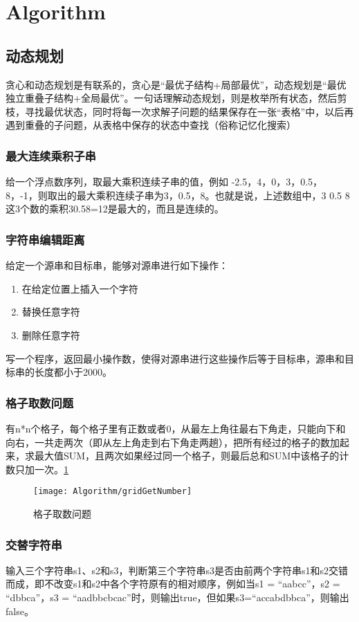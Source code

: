 \section{Algorithm}
\subsection{动态规划}
贪心和动态规划是有联系的，贪心是“最优子结构+局部最优”，动态规划是“最优独立重叠子结构+全局最优”。一句话理解动态规划，则是枚举所有状态，然后剪枝，寻找最优状态，同时将每一次求解子问题的结果保存在一张“表格”中，以后再遇到重叠的子问题，从表格中保存的状态中查找（俗称记忆化搜索）
\subsubsection{最大连续乘积子串}
给一个浮点数序列，取最大乘积连续子串的值，例如 -2.5，4，0，3，0.5，8，-1，则取出的最大乘积连续子串为3，0.5，8。也就是说，上述数组中，3 0.5 8这3个数的乘积30.58=12是最大的，而且是连续的。
\subsubsection{字符串编辑距离}
给定一个源串和目标串，能够对源串进行如下操作：
\begin{enumerate}
  \item 在给定位置上插入一个字符
  \item 替换任意字符
  \item 删除任意字符
\end{enumerate}
写一个程序，返回最小操作数，使得对源串进行这些操作后等于目标串，源串和目标串的长度都小于2000。
\subsubsection{格子取数问题}
有n*n个格子，每个格子里有正数或者0，从最左上角往最右下角走，只能向下和向右，一共走两次（即从左上角走到右下角走两趟），把所有经过的格子的数加起来，求最大值SUM，且两次如果经过同一个格子，则最后总和SUM中该格子的计数只加一次。\ref{fig:alg:gridGetNumber}
\begin{figure}
  \centering
  \texttt{[image: Algorithm/gridGetNumber]}\\
  \caption{格子取数问题}\label{fig:alg:gridGetNumber}
\end{figure}
\subsubsection{交替字符串}
输入三个字符串s1、s2和s3，判断第三个字符串s3是否由前两个字符串s1和s2交错而成，即不改变s1和s2中各个字符原有的相对顺序，例如当s1 = “aabcc”，s2 = “dbbca”，s3 = “aadbbcbcac”时，则输出true，但如果s3=“accabdbbca”，则输出false。